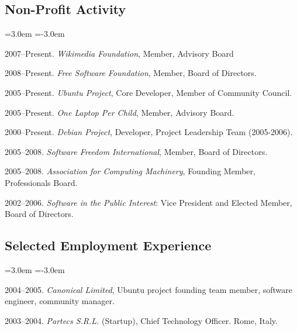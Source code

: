 \documentclass[10pt]{article}
\newenvironment{cvlist}{
\begin{list}{}{\leftmargin=3.0em \itemindent=-3.0em}
  \setlength{\itemsep}{0pt}
  \setlength{\parskip}{0em}
  \setlength{\parsep}{1em}
  \setlength{\parindent}{0em}}
{\vspace{1em}
\end{list}}
\begin{document}
\subsection{Non-Profit Activity}
\begin{cvlist}
\item 2007--Present. \emph{Wikimedia Foundation}, Member, Advisory Board
\item 2008--Present. \emph{Free Software Foundation}, Member, Board of Directors.
\item 2005--Present. \emph{Ubuntu Project}, Core Developer, Member of Community Council.
\item 2005--Present. \emph{One Laptop Per Child}, Member, Advisory Board.
\item 2000--Present. \emph{Debian Project}, Developer, Project Leadership Team (2005-2006).
\item 2005--2008. \emph{Software Freedom International}, Member, Board of Directors.
\item 2005--2008. \emph{Association for Computing Machinery}, Founding Member, Professionals Board.
\item 2002--2006. \emph{Software in the Public Interest}: Vice President and Elected Member, Board of Directors.
\end{cvlist}

\subsection{Selected Employment Experience}
\begin{cvlist}
\item 2004--2005. \emph{Canonical Limited}, Ubuntu project founding team
  member, software engineer, community manager.
\item 2003--2004. \emph{Partecs S.R.L.} (Startup), Chief Technology
  Officer. Rome, Italy.
\end{cvlist}
\end{document}
